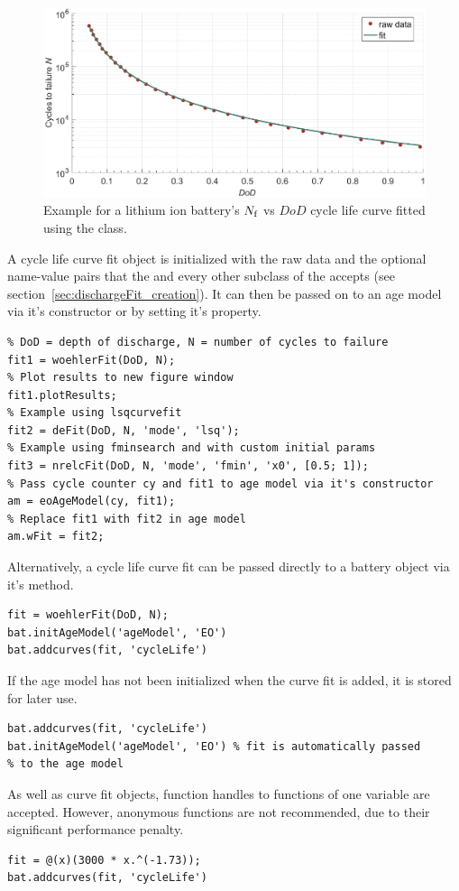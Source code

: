 \begin{figure}[t!]
	\captionsetup{type=figure}
	\centering
	\includegraphics[width=\textwidth]{woehlerFit}
	\caption[Example for a lithium ion battery's $N\subi{f}$ vs $DoD$ cycle life curve fitted using the  class]{Example for a lithium ion battery's $N\subi{f}$ vs $DoD$ cycle life curve fitted using the  class.}
	\label{fig:woehlerFit}
\end{figure}
A cycle life curve fit object is initialized with the raw data and the optional name-value pairs that the  and every other subclass of the  accepts (see section~\ref{sec:dischargeFit_creation}). It can then be passed on to an age model via it's constructor or by setting it's  property.
\begin{lstlisting}
% DoD = depth of discharge, N = number of cycles to failure
fit1 = woehlerFit(DoD, N);
% Plot results to new figure window
fit1.plotResults;
% Example using lsqcurvefit
fit2 = deFit(DoD, N, 'mode', 'lsq');
% Example using fminsearch and with custom initial params
fit3 = nrelcFit(DoD, N, 'mode', 'fmin', 'x0', [0.5; 1]);
% Pass cycle counter cy and fit1 to age model via it's constructor
am = eoAgeModel(cy, fit1);
% Replace fit1 with fit2 in age model
am.wFit = fit2;
\end{lstlisting}
\clearpage
Alternatively, a cycle life curve fit can be passed directly to a battery object  via it's  method.
\begin{lstlisting}
fit = woehlerFit(DoD, N);
bat.initAgeModel('ageModel', 'EO')
bat.addcurves(fit, 'cycleLife')
\end{lstlisting}
If the age model has not been initialized when the curve fit is added, it is stored for later use.
\begin{lstlisting}
bat.addcurves(fit, 'cycleLife')
bat.initAgeModel('ageModel', 'EO') % fit is automatically passed
% to the age model
\end{lstlisting}
As well as curve fit objects, function handles to functions of one variable are accepted. However, anonymous functions are not recommended, due to their significant performance penalty.
\begin{lstlisting}
fit = @(x)(3000 * x.^(-1.73));
bat.addcurves(fit, 'cycleLife')
\end{lstlisting}

